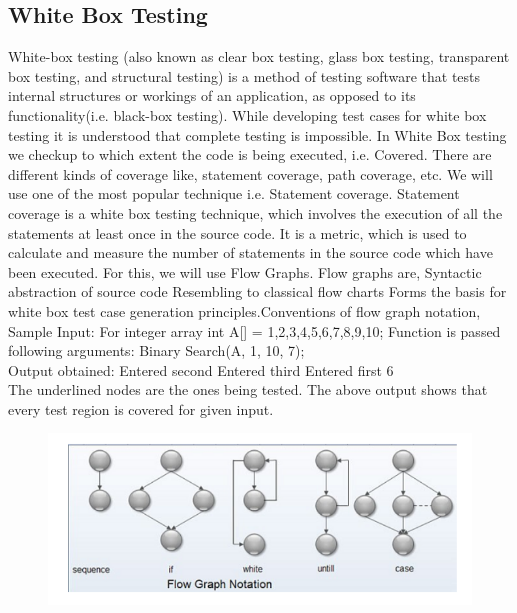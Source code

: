 \documentclass[10pt,a4paper]{article}
\begin{document}
	\subsection{White Box Testing}
	White-box testing (also known as clear box testing, glass box testing, transparent box testing, and structural testing) is a method of testing software that tests internal structures or workings of an application, as opposed to its functionality(i.e. black-box testing). While developing 
	test cases for white box testing it is understood that complete testing 
	is impossible. In White Box testing we checkup to which extent the code 
	is being executed, i.e. Covered. There are different kinds of coverage like, statement coverage, path coverage, etc. We will use one of the most popular technique i.e. Statement coverage. Statement coverage is a white box testing technique, which involves the execution of all the statements at least once in the source code. It is a metric, which is used to calculate and measure the number of statements in the source code which have been executed. For this, we will use Flow Graphs. Flow graphs are, Syntactic abstraction of source code Resembling to classical flow charts Forms the basis for white box test case generation principles.Conventions of flow graph notation, \\
	Sample Input: For integer array int A[] = 1,2,3,4,5,6,7,8,9,10; Function 
	is passed\\
	following arguments: Binary Search(A, 1, 10, 7);\\
	Output obtained: Entered second Entered third Entered first 6\\
	The underlined nodes are the ones being tested. The above output shows
	that every test region is covered for given input.\\
	
	\begin{figure}[h!]
		\centering
		\includegraphics[scale=0.5]{pqr.png}
		\end{figure}
		
\end{document}
